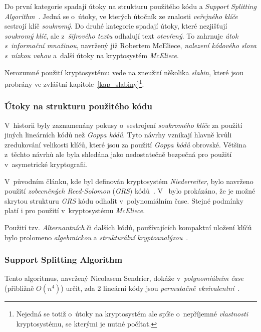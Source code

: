 \documentclass[thesis=M,czech,hidelinks]{FITthesis}[2012/06/26]
\newcommand{\0}{{\textcolor[gray]{0.80}{0}}}
\begin{document}
Do první kategorie spadají útoky na strukturu použitého kódu a \emph{Support
Splitting Algorithm}~\cite{Sendrier}. Jedná se o~útoky, ve kterých útočník ze
znalosti \emph{veřejného klíče} sestrojí klíč \emph{soukromý}. Do druhé
kategorie spadají útoky, které nezjišťují \emph{soukromý klíč}, ale
z~\emph{šifrového textu} odhalují text \emph{otevřený}. To zahrnuje \emph{útok
s~informační množinou}, navržený již Robertem McEliece, \emph{nalezení kódového
slova s~nízkou vahou} a~další útoky na kryptosystém \emph{McEliece}.

Nerozumné použití kryptosystému vede na zneužití několika \emph{slabin}, které
jsou probrány ve zvláštní kapitole~\ref{kap_slabiny}\footnote{
    Nejedná se totiž o~útoky na kryptosystém ale spíše o~nepříjemné
    \emph{vlastnosti} kryptosystému, se kterými je nutné počítat.
}.

\subsubsection{Útoky na strukturu použitého kódu}\label{kap_utoky_na_strukturu_kodu}

V~historii byly zaznamenány pokusy o~sestrojení \emph{soukromého klíče} za
použití jiných lineárních kódů než \emph{Goppa kódů}. Tyto návrhy vznikají
hlavně kvůli zredukování velikosti klíčů, které jsou za použití \emph{Goppa
kódů} obrovské. Většina z~těchto návrhů ale byla shledána jako nedostatečně
bezpečná pro použití v~asymetrické kryptografii.

V~původním článku, kde byl definován kryptosystém \emph{Niederreiter}, bylo
navrženo použití \emph{zobecněných Reed-Solomon} (\emph{GRS})
kódů~\cite{Niederreiter}. V~\cite{Sidelnikov} bylo prokázáno, že je možné
skrytou strukturu \emph{GRS} kódu odhalit v~polynomiálním čase. Stejné podmínky
platí i pro použití v~kryptosystému \emph{McEliece}.

Použití tzv. \emph{Alternantních} či dalších kódů, používajících kompaktní
uložení klíčů bylo prolomeno \emph{algebraickou} a \emph{strukturální
kryptoanalýzou}~\cite{Faugere1,Faugere2,Umana}.


\subsubsection{Support Splitting Algorithm}

Tento algoritmus, navržený Nicolasem Sendrier, dokáže v~\emph{polynomiálním
čase} (přibližně $O(n^4)$) určit, zda 2 lineární kódy jsou \emph{permutačně
ekvivalentní}~\cite{Sendrier}.
\end{document}
